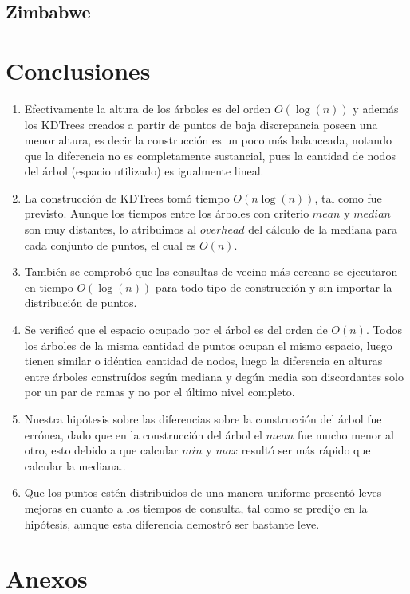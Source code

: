 \documentclass[12pt,letterpaper, margin = 3cm]{article}
\begin{document}
\subsection{Zimbabwe}

\newpage
\section{Conclusiones}
\begin{enumerate} 
\item Efectivamente la altura de los árboles es del orden $O(\log(n))$ y además los KDTrees creados a partir de puntos de baja discrepancia poseen una menor altura, es decir la construcción es un poco más balanceada, notando que la diferencia no es completamente sustancial, pues la cantidad de nodos del árbol (espacio utilizado) es igualmente lineal.
\item La construcción de KDTrees tomó tiempo $O(n\log(n))$, tal como fue previsto. Aunque los tiempos entre los árboles con criterio $mean$ y $median$ son muy distantes, lo atribuimos al $overhead$ del cálculo de la mediana para cada conjunto de puntos, el cual es $O(n)$.
\item También se comprobó que las consultas de vecino más cercano se ejecutaron en tiempo $O(\log(n))$ para todo tipo de construcción y sin importar la distribución de puntos.
\item Se verificó que el espacio ocupado por el árbol es del orden de $O(n)$. Todos los árboles de la misma cantidad de puntos ocupan el mismo espacio, luego tienen similar o idéntica cantidad de nodos, luego la diferencia en alturas entre árboles construídos según mediana y degún media son discordantes solo por un par de ramas y no por el último nivel completo.
\item Nuestra hipótesis sobre las diferencias sobre la construcción del árbol fue errónea, dado que en la construcción del árbol el $mean$ fue mucho menor al otro, esto debido a que calcular $min$ y $max$ resultó ser más rápido que calcular la mediana..
\item Que los puntos estén distribuidos de una manera uniforme presentó leves mejoras en cuanto a los tiempos de consulta, tal como se predijo en la hipótesis, aunque esta diferencia demostró ser bastante leve.
\end{enumerate}




\newpage
\section{Anexos}
\end{document}
